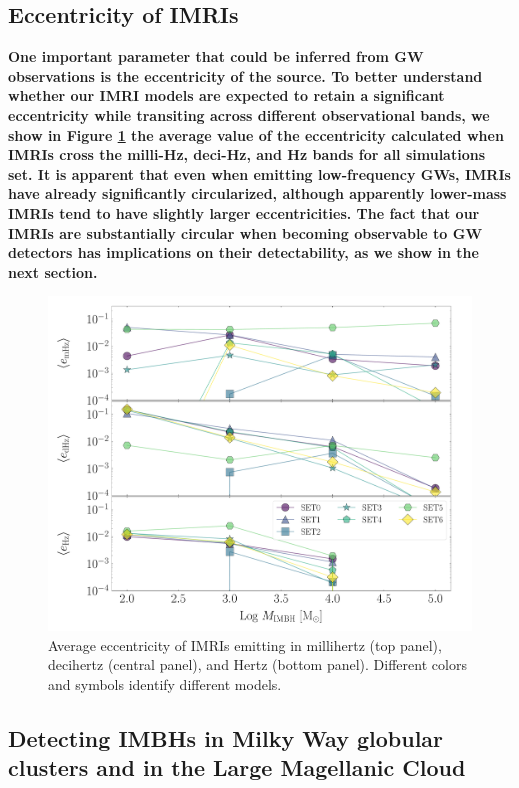 \documentclass[article]{aa}
\begin{document}
\subsection{Eccentricity of IMRIs}
{\bf
One important parameter that could be inferred from GW observations is the eccentricity of the source. To better understand whether our IMRI models are expected to retain a significant eccentricity while transiting across different observational bands, we show in Figure \ref{fig:f10} the average value of the eccentricity calculated when IMRIs cross the milli-Hz, deci-Hz, and Hz bands for all simulations set. It is apparent that even when emitting low-frequency GWs, IMRIs have already significantly circularized, although apparently lower-mass IMRIs tend to have slightly larger eccentricities. The fact that our IMRIs are substantially circular when becoming observable to GW detectors has implications on their detectability, as we show in the next section.
}

\begin{figure}
\centering
\includegraphics[width=\columnwidth]{averageec}
\caption{Average eccentricity of IMRIs emitting in millihertz (top panel), decihertz (central panel), and Hertz (bottom panel). Different colors and symbols identify different models. }
\label{fig:f10}
\end{figure}



\subsection{Detecting IMBHs in Milky Way globular clusters and in the Large Magellanic Cloud}
\end{document}
